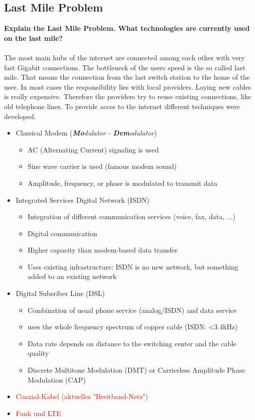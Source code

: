\documentclass[a4paper,12pt]{article}
\begin{document}
	\subsection{Last Mile Problem}
	\textbf{Explain the Last Mile Problem. What technologies are currently used on the last mile?}\\
\\	
	The most main hubs of the internet are connected among each other with very fast Gigabit connections. The bottleneck of the users speed is the so called last mile. That means the connection from the last switch station to the home of the user. In most cases the responsibility lies with local providers. Laying new cables is really expensive. Therefore the providers try to reuse existing connections, like old telephone lines. To provide acces to the internet different techniques were developed.
	
	\begin{itemize}
		\item Classical Modem (\textit{\textbf{Mo}dulator - \textbf{Dem}odulator})
		\begin{itemize}
			\item AC (Alternating Current) signaling is used
			\item Sine wave carrier is used (famous modem sound)
			\item Amplitude, frequency, or phase is modulated to transmit data
		\end{itemize}
		\item Integrated Services Digital Network (ISDN)
		\begin{itemize}
			\item Integration of different communication services (voice, fax, data, ...)
			\item Digital communication
			\item Higher capacity than modem-based data transfer
			\item Uses existing infrastructure: ISDN is no new network, but something added to an existing network
		\end{itemize}
		\item Digital Subsriber Line (DSL)
		\begin{itemize}
			\item Combination of usual phone service (analog/ISDN) and data service
			\item uses the whole frequency spectrum of copper cable (ISDN: <3.4kHz)
			\item Data rate depends on distance to the switching center and the cable quality
			\item Discrete Multitone Modulation (DMT) or Carrierless Amplitude Phase Modulation (CAP)
		\end{itemize}
		\item \textcolor{red}{Coaxial-Kabel (aktuelles "Breitband-Netz")}
		\item \textcolor{red}{Funk und LTE} 
	\end{itemize}
	
\end{document}
